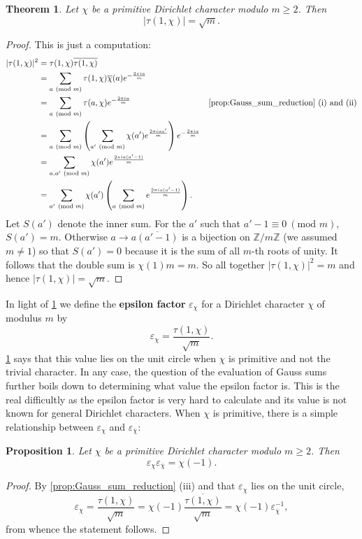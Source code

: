 \documentclass[12pt]{book}
\newtheorem{theorem}{Theorem}[section]
\newtheorem{proposition}{Proposition}[section]
\theoremstyle{definition}\newframedtheorem{method}{Method}
\newcommand{\tmod}[1]{\ \left(\text{mod }#1\right)}
\newcommand{\Z}{\mathbb{Z}}
\newcommand{\e}{\varepsilon}
\newcommand{\<}{\langle}
\renewcommand{\>}{\rangle}
\newcommand{\conj}{\overline}
\newcommand{\cchi}{\conj{\chi}}
\begin{document}
      \begin{theorem}\label{thm:Gauss_sum_modulus}
        Let $\chi$ be a primitive Dirichlet character modulo $m \ge 2$. Then
        \[
          |\tau(1,\chi)| = \sqrt{m}.
        \]
      \end{theorem}
      \begin{proof}
        This is just a computation:
        \begin{align*}
          |\tau(1,\chi)|^{2} &= \tau(1,\chi)\conj{\tau(1,\chi)} \\
          &= \sum_{a \tmod{m}}\tau(1,\chi)\cchi(a)e^{-\frac{2\pi ia}{m}} \\
          &=  \sum_{a \tmod{m}}\tau(a,\chi)e^{-\frac{2\pi ia}{m}} & \text{\cref{prop:Gauss_sum_reduction} (i) and (ii)} \\
          &= \sum_{a \tmod{m}}\left(\sum_{a' \tmod{m}}\chi(a')e^{\frac{2\pi iaa'}{m}}\right)e^{-\frac{2\pi ia}{m}} \\
          &= \sum_{a,a' \tmod{m}}\chi(a')e^{\frac{2\pi ia(a'-1)}{m}} \\
          &= \sum_{a' \tmod{m}}\chi(a')\left(\sum_{a \tmod{m}}e^{\frac{2\pi ia(a'-1)}{m}}\right).
        \end{align*}
        Let $S(a')$ denote the inner sum. For the $a'$ such that $a'-1 \equiv 0 \tmod{m}$, $S(a') = m$. Otherwise $a \to a\conj{(a'-1)}$ is a bijection on $\Z/m\Z$ (we assumed $m \neq 1$) so that $S(a') = 0$ because it is the sum of all $m$-th roots of unity. It follows that the double sum is $\chi(1)m = m$. So all together $|\tau(1,\chi)|^{2} = m$ and hence $|\tau(1,\chi)| = \sqrt{m}$.
      \end{proof}

      In light of \cref{thm:Gauss_sum_modulus} we define the \textbf{epsilon factor} $\e_{\chi}$ for a Dirichlet character $\chi$ of modulus $m$ by
      \[
        \e_{\chi} = \frac{\tau(1,\chi)}{\sqrt{m}}.
      \]
      \cref{thm:Gauss_sum_modulus} says that this value lies on the unit circle when $\chi$ is primitive and not the trivial character. In any case, the question of the evaluation of Gauss sums further boils down to determining what value the epsilon factor is. This is the real difficultly as the epsilon factor is very hard to calculate and its value is not known for general Dirichlet characters. When $\chi$ is primitive, there is a simple relationship between $\e_{\chi}$ and $\e_{\cchi}$:

      \begin{proposition}\label{prop:epsilon_factor_relationship}
        Let $\chi$ be a primitive Dirichlet character modulo $m \ge 2$. Then
        \[
          \e_{\chi}\e_{\cchi} = \chi(-1).
        \]
      \end{proposition}
      \begin{proof}
        By \cref{prop:Gauss_sum_reduction} (iii) and that $\e_{\chi}$ lies on the unit circle,
        \[
          \e_{\chi} = \frac{\tau(1,\chi)}{\sqrt{m}} = \chi(-1)\conj{\frac{\tau(1,\chi)}{\sqrt{m}}} = \chi(-1)\e_{\cchi}^{-1},
        \]
        from whence the statement follows.
      \end{proof}
\end{document}
